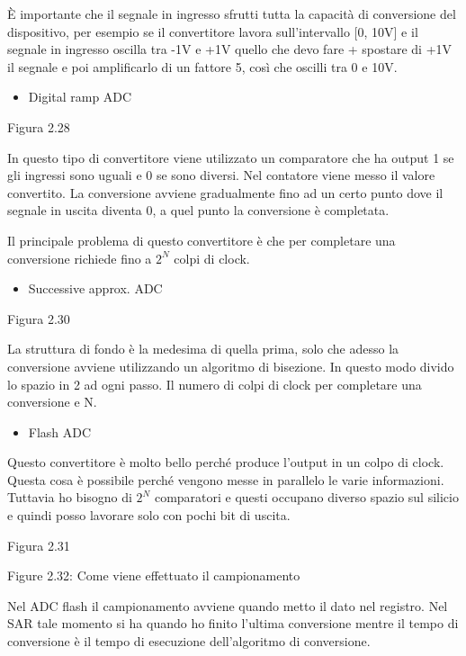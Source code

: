 \documentclass[
]{article}
\providecommand{\tightlist}{%
  \setlength{\itemsep}{0pt}\setlength{\parskip}{0pt}}
\begin{document}
È importante che il segnale in ingresso sfrutti tutta la capacità di
conversione del dispositivo, per esempio se il convertitore lavora
sull'intervallo {[}0, 10V{]} e il segnale in ingresso oscilla tra -1V e
+1V quello che devo fare + spostare di +1V il segnale e poi amplificarlo
di un fattore 5, così che oscilli tra 0 e 10V.

\begin{itemize}
\tightlist
\item
  Digital ramp ADC
\end{itemize}

Figura 2.28

In questo tipo di convertitore viene utilizzato un comparatore che ha
output 1 se gli ingressi sono uguali e 0 se sono diversi. Nel contatore
viene messo il valore convertito. La conversione avviene gradualmente
fino ad un certo punto dove il segnale in uscita diventa 0, a quel punto
la conversione è completata.

Il principale problema di questo convertitore è che per completare una
conversione richiede fino a \(2^{N}\) colpi di clock.

\begin{itemize}
\tightlist
\item
  Successive approx. ADC
\end{itemize}

Figura 2.30

La struttura di fondo è la medesima di quella prima, solo che adesso la
conversione avviene utilizzando un algoritmo di bisezione. In questo
modo divido lo spazio in 2 ad ogni passo. Il numero di colpi di clock
per completare una conversione e N.

\begin{itemize}
\tightlist
\item
  Flash ADC
\end{itemize}

Questo convertitore è molto bello perché produce l'output in un colpo di
clock. Questa cosa è possibile perché vengono messe in parallelo le
varie informazioni. Tuttavia ho bisogno di \(2^{N}\) comparatori e
questi occupano diverso spazio sul silicio e quindi posso lavorare solo
con pochi bit di uscita.

Figura 2.31

Figure 2.32: Come viene effettuato il campionamento

Nel ADC flash il campionamento avviene quando metto il dato nel
registro. Nel SAR tale momento si ha quando ho finito l'ultima
conversione mentre il tempo di conversione è il tempo di esecuzione
dell'algoritmo di conversione.
\end{document}
